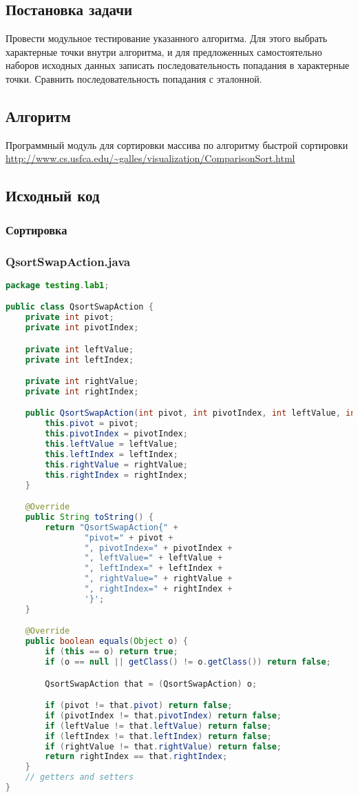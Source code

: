 \subsection{Постановка задачи}
Провести модульное тестирование указанного алгоритма. Для этого выбрать характерные точки внутри алгоритма, и для предложенных самостоятельно наборов исходных данных записать последовательность попадания в характерные точки. Сравнить последовательность попадания с эталонной.
\subsection{Алгоритм}
Программный модуль для сортировки массива по алгоритму быстрой сортировки \url{http://www.cs.usfca.edu/~galles/visualization/ComparisonSort.html}
\subsection{Исходный код}
\subsubsection{Сортировка}

\subsubsection{QsortSwapAction.java}
\begin{lstlisting}[language=java]
package testing.lab1;

public class QsortSwapAction {
    private int pivot;
    private int pivotIndex;

    private int leftValue;
    private int leftIndex;

    private int rightValue;
    private int rightIndex;

    public QsortSwapAction(int pivot, int pivotIndex, int leftValue, int leftIndex, int rightValue, int rightIndex) {
        this.pivot = pivot;
        this.pivotIndex = pivotIndex;
        this.leftValue = leftValue;
        this.leftIndex = leftIndex;
        this.rightValue = rightValue;
        this.rightIndex = rightIndex;
    }

    @Override
    public String toString() {
        return "QsortSwapAction{" +
                "pivot=" + pivot +
                ", pivotIndex=" + pivotIndex +
                ", leftValue=" + leftValue +
                ", leftIndex=" + leftIndex +
                ", rightValue=" + rightValue +
                ", rightIndex=" + rightIndex +
                '}';
    }

    @Override
    public boolean equals(Object o) {
        if (this == o) return true;
        if (o == null || getClass() != o.getClass()) return false;

        QsortSwapAction that = (QsortSwapAction) o;

        if (pivot != that.pivot) return false;
        if (pivotIndex != that.pivotIndex) return false;
        if (leftValue != that.leftValue) return false;
        if (leftIndex != that.leftIndex) return false;
        if (rightValue != that.rightValue) return false;
        return rightIndex == that.rightIndex;
    }
    // getters and setters
}
\end{lstlisting}
